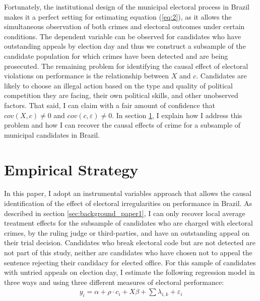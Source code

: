 \documentclass[11pt]{article}
\newcommand{\refp}[1]{(\ref{#1})}
\begin{document}
Fortunately, the institutional design of the municipal electoral process in Brazil makes it a perfect setting for estimating equation \refp{eq:2}, as it allows the simultaneous observation of both crimes and electoral outcomes under certain conditions. The dependent variable can be observed for candidates who have outstanding appeals by election day and thus we construct a subsample of the candidate population for which crimes have been detected and are being prosecuted. The remaining problem for identifying the causal effect of electoral violations on performance is the relationship between $X$ and $c$. Candidates are likely to choose an illegal action based on the type and quality of political competition they are facing, their own political skills, and other unobserved factors. That said, I can claim with a fair amount of confidence that $cov(X,c) \neq 0$ and $cov(c, \varepsilon) \neq 0$. In section \ref{sec:methods_paper1}, I explain how I address this problem and how I can recover the causal effects of crime for a subsample of municipal candidates in Brazil.

\section{Empirical Strategy} \label{sec:methods_paper1}

In this paper, I adopt an instrumental variables approach that allows the causal identification of the effect of electoral irregularities on performance in Brazil. As described in section \ref{sec:background_paper1}, I can only recover local average treatment effects for the subsample of candidates who are charged with electoral crimes, by the ruling judge or third-parties, and have an outstanding appeal on their trial decision. Candidates who break electoral code but are not detected are not part of this study, neither are candidates who have chosen not to appeal the sentence rejecting their candidacy for elected office. For this sample of candidates with untried appeals on election day, I estimate the following regression model in three ways and using three different measures of electoral performance:
\begin{equation} \label{eq:reg1}
  \begin{split}
    y_{i} = \alpha + \rho \cdot c_{i} + X\beta + \sum \lambda_{i, k} + \varepsilon_{i}
  \end{split}
\end{equation}
\end{document}
